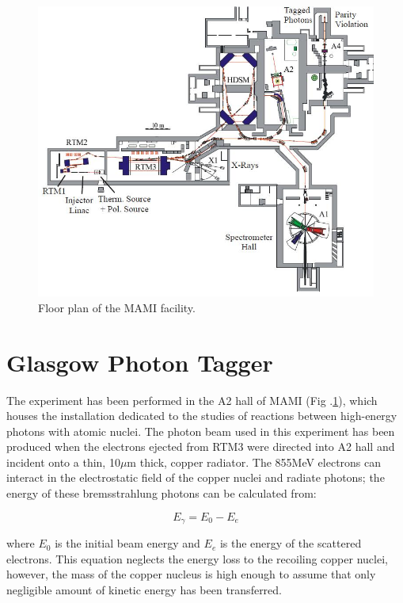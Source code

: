 \begin{figure}[H]
\begin{center}
\includegraphics[scale=0.5]{mamifloor.jpg}
\caption{Floor plan of the MAMI facility.}
\label{mamifloor}
\end{center}
\end{figure}

\section{Glasgow Photon Tagger}

\indent The experiment has been performed in the A2 hall of MAMI (Fig .\ref{mamifloor}), which houses the installation dedicated to the studies of reactions between high-energy photons with atomic nuclei. The photon beam used in this experiment has been produced when the electrons ejected from RTM3 were directed into A2 hall and incident onto a thin, 10$\mu$m thick, copper radiator. The 855MeV electrons can interact in the electrostatic field of the copper nuclei and radiate photons; the energy of these bremsstrahlung photons can be calculated from:

\begin{equation}
E_{\gamma}=E_{0}-E_{e}
\end{equation}

where $E_{0}$ is the initial beam energy and $E_{e}$ is the energy of the scattered electrons. This equation neglects the energy loss to the recoiling copper nuclei, however, the mass of the copper nucleus is high enough to assume that only negligible amount of kinetic energy has been transferred.

